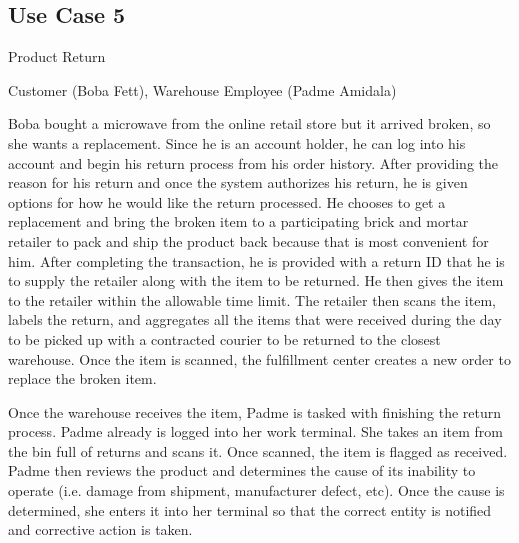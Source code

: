 \subsection{Use Case 5}
\begin{description}[font=\bfseries\itshape]
\item[Title:]Product Return
\item[Actors:]Customer (Boba Fett), Warehouse Employee (Padme Amidala)
\item[Description:]Boba bought a microwave from the online retail store but it arrived broken, so she wants a replacement.  Since he is an account holder, he can log into his account and begin his return process from his order history.  After providing the reason for his return and once the system authorizes his return, he is given options for how he would like the return processed.  He chooses to get a replacement and bring the broken item to a participating brick and mortar retailer to pack and ship the product back because that is most convenient for him.  After completing the transaction, he is provided with a return ID that he is to supply the retailer along with the item to be returned.  He then gives the item to the retailer within the allowable time limit.  The retailer then scans the item, labels the return, and aggregates all the items that were received during the day to be picked up with a contracted courier to be returned to the closest warehouse.  Once the item is scanned, the fulfillment center creates a new order to replace the broken item.

\hspace*{2em}Once the warehouse receives the item, Padme is tasked with finishing the return process.  Padme already is logged into her work terminal.  She takes an item from the bin full of returns and scans it.  Once scanned, the item is flagged as received.  Padme then reviews the product and determines the cause of its inability to operate (i.e. damage from shipment, manufacturer defect, etc).  Once the cause is determined, she enters it into her terminal so that the correct entity is notified and corrective action is taken.
\end{description}